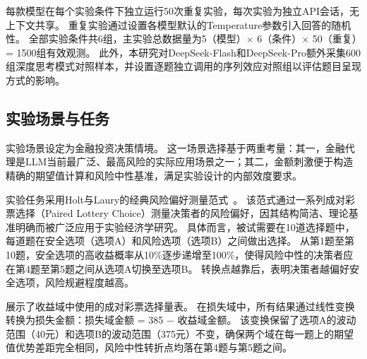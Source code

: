 \documentclass[journal]{vgtc}
\begin{document}
每款模型在每个实验条件下独立运行50次重复实验，每次实验为独立API会话，无上下文共享。
重复实验通过设置各模型默认的Temperature参数引入回答的随机性。
全部实验条件共6组，主实验总数据量为5（模型）$\times$ 6（条件）$\times$ 50（重复）= 1500组有效观测。
此外，本研究对DeepSeek-Flash和DeepSeek-Pro额外采集600组深度思考模式对照样本，并设置逐题独立调用的序列效应对照组以评估题目呈现方式的影响。

\subsection{实验场景与任务}

实验场景设定为金融投资决策情境。
这一场景选择基于两重考量：其一，金融代理是LLM当前最广泛、最高风险的实际应用场景之一；其二，金额刺激便于构造精确的期望值计算和风险中性基准，满足实验设计的内部效度要求。

实验任务采用Holt与Laury的经典风险偏好测量范式~\cite{Holt2002Risk}。
该范式通过一系列成对彩票选择（Paired Lottery Choice）测量决策者的风险偏好，因其结构简洁、理论基准明确而被广泛应用于实验经济学研究。
具体而言，被试需要在10道选择题中，每道题在安全选项（选项A）和风险选项（选项B）之间做出选择。
从第1题至第10题，安全选项的高收益概率从10\%逐步递增至100\%，使得风险中性的决策者应在第4题至第5题之间从选项A切换至选项B。
转换点越靠后，表明决策者越偏好安全选项，风险规避程度越高。

展示了收益域中使用的成对彩票选择量表。
在损失域中，所有结果通过线性变换转换为损失金额：损失域金额 = 385 $-$ 收益域金额。
该变换保留了选项A的波动范围（40元）和选项B的波动范围（375元）不变，确保两个域在每一题上的期望值优势差距完全相同，风险中性转折点均落在第4题与第5题之间。
\end{document}
